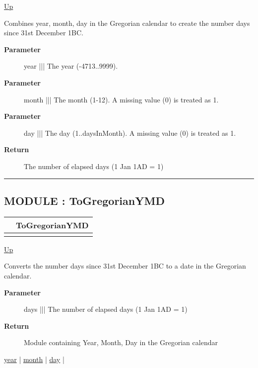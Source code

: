 \hyperlink{ecldoc:Date}{Up}

\par
Combines year, month, day in the Gregorian calendar to create the number days since 31st December 1BC.

\par
\begin{description}
\item [\textbf{Parameter}] year ||| The year (-4713..9999).
\item [\textbf{Parameter}] month ||| The month (1-12). A missing value (0) is treated as 1.
\item [\textbf{Parameter}] day ||| The day (1..daysInMonth). A missing value (0) is treated as 1.
\item [\textbf{Return}] The number of elapsed days (1 Jan 1AD = 1)
\end{description}

\rule{\textwidth}{0.4pt}
\subsection*{MODULE : ToGregorianYMD}
\hypertarget{ecldoc:date.togregorianymd}{}

{\renewcommand{\arraystretch}{1.5}
\begin{tabularx}{\textwidth}{|>{\raggedright\arraybackslash}l|X|}
\hline
\hspace{0pt} & ToGregorianYMD \\
\hline
\multicolumn{2}{|>{\raggedright\arraybackslash}X|}{\hspace{0pt}(Days\_t days)} \\
\hline
\end{tabularx}
}

\hyperlink{ecldoc:Date}{Up}

\par
Converts the number days since 31st December 1BC to a date in the Gregorian calendar.

\par
\begin{description}
\item [\textbf{Parameter}] days ||| The number of elapsed days (1 Jan 1AD = 1)
\item [\textbf{Return}] Module containing Year, Month, Day in the Gregorian calendar
\end{description}

\hyperlink{ecldoc:date.togregorianymd.result.year}{year}  |
\hyperlink{ecldoc:date.togregorianymd.result.month}{month}  |
\hyperlink{ecldoc:date.togregorianymd.result.day}{day}  |

